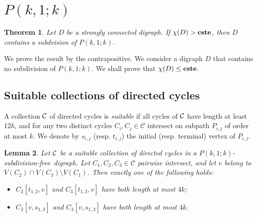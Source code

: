 \documentclass[utf8,11pt]{article}
\theoremstyle{plain}
\newtheorem{theorem}{Theorem}
\newtheorem{lemma}[theorem]{Lemma}
\theoremstyle{definition}
\theoremstyle{remark}
\newcommand{\cste}{\bf cste}
\newcommand{\free}{subdivision-free}
\begin{document}
\section{$P(k,1;k)$}

\begin{theorem}\label{th:main}
Let $D$ be a strongly connected digraph. If $\chi(D) > \cste$, then $D$ contains a subdvision of $P(k,1;k)$.
\end{theorem}


We prove the result by the contrapositive. We consider a digraph $D$ that contains no subdivision of $P(k,1;k)$.
We shall prove that $\chi(D) \leq \cste$.

\subsection{Suitable collections of directed cycles}
 
 A collection ${\cal C}$ of directed cycles is {\it suitable} if all cycles of ${\cal C}$ have length at least $12k$, and for
any two distinct cycles $C_i,C_j\in\mathcal C$ intersect on  subpath $P_{i,j}$ of order at most $k$.
We denote by $s_{i,j}$ (resp. $t_{i,j}$) the initial (resp. terminal) vertex of  $P_{i,j}$.
 
 
 
 \begin{lemma}\label{lem:dis}
 Let ${\cal C}$ be a suitable collection of directed cycles in a $P(k,1;k)$-\free\ digraph.
Let $C_1,C_2,C_3\in\mathcal C$ pairwise intersect, and let $v$ belong to $V(C_2)\cap V(C_3)\setminus V(C_1)$. Then exactly one of the following holds:
\begin{itemize}
\item $C_2[t_{1,2}, v]$ and $C_3[t_{1,3}, v]$ have both length at most $4k$; 
\item $C_2[v, s_{1,2}]$ and $C_3[v, s_{1,3}]$ have both length at most $4k$.
\end{itemize}
\end{lemma}
\end{document}
